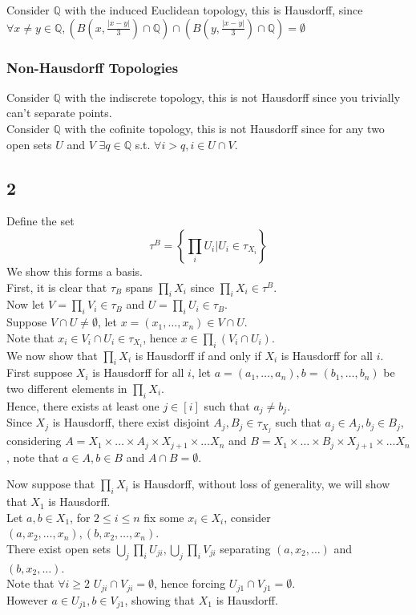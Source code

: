 \documentclass[11pt, a4paper]{article}
\begin{document}
Consider $\mathbb{Q}$ with the induced Euclidean topology, this is  Hausdorff, since $\forall x\neq y \in \mathbb{Q}, \left( B( x,  \frac{|x-y|}{3}) \cap \mathbb{Q} \right) \cap ( B(y, \frac{|x-y|}{3} ) \cap \mathbb{Q})= \emptyset $ 
\subsubsection*{Non-Hausdorff Topologies}
Consider $ \mathbb{Q}$ with the indiscrete topology, this is not Hausdorff since you trivially can't separate points.\\

Consider $ \mathbb{Q}$ with the cofinite topology, this is not Hausdorff since for any two open sets $U$ and $V$ $\exists q \in \mathbb{Q}$ s.t. $\forall i>q, i \in U\cap V $.

\subsection*{2}
Define the set 
\[ 
\tau^{B} = \left\{ \prod_i U_i | U_i \in \tau_{X_i}  \right\} 	
\]
We show this forms a basis.\\
First, it is clear that $\tau_B$ spans $\prod_i X_i$ since $\prod_i X_i \in \tau^{B}$.\\
Now let $V = \prod_i V_i\in \tau_B$ and $U = \prod_i U_i\in \tau_B$.\\
Suppose $V\cap U \neq \emptyset$, let $x= ( x_1, \ldots, x_n) \in V\cap U$.\\
Note that $x_i \in V_i\cap U_i\in \tau_{X_i} $, hence $x \in \prod_i ( V_i\cap U_i) $. \\

We now show that $ \prod_i X_i$ is Hausdorff if and only if $X_i$ is Hausdorff for all $i$.\\
First suppose $X_i$ is Hausdorff for all $i$, let $ a= ( a_1, \ldots, a_n) , b = ( b_1, \ldots, b_n) $ be two different elements in $ \prod_i X_i$.\\
Hence, there exists at least one $j \in [ i] $ such that $a_j \neq b_j$.\\
Since $X_j$ is Hausdorff, there exist disjoint $ A_j, B_j \in \tau_{X_j} $ such that $a_j \in A_j, b_j \in B_j$, considering $ A = X_1 \times \ldots \times A_j \times X_{j+1} \times \ldots X_n$ and $ B= X_1 \times \ldots \times B_j \times X_{j+1} \times \ldots X_n$, note that $a \in A, b \in B$ and $A\cap B = \emptyset$.

Now suppose that $\prod_i X_i$ is Hausdorff, without loss of generality, we will show that $X_1$ is Hausdorff.\\
Let $a,b \in X_1$, for $ 2 \leq i \leq n$ fix some $x_i\in X_i$, consider $( a, x_2, \ldots, x_n) ,( b,x_2, \ldots, x_n) $.\\
There exist open sets $ \bigcup_j \prod_i U_{ji} , \bigcup_j \prod_i V_{ji} $ separating $( a,x_2, \ldots) $ and $( b,x_2, \ldots) $.\\
Note that $\forall i \geq 2$ $ U_{j i} \cap V_{ji} = \emptyset$, hence forcing $U_{j1} \cap V_{j 1} = \emptyset $.\\
However $a \in U_{j 1}, b \in V_{j 1} 	 $, showing that $X_1$ is Hausdorff.\\
\end{document}
